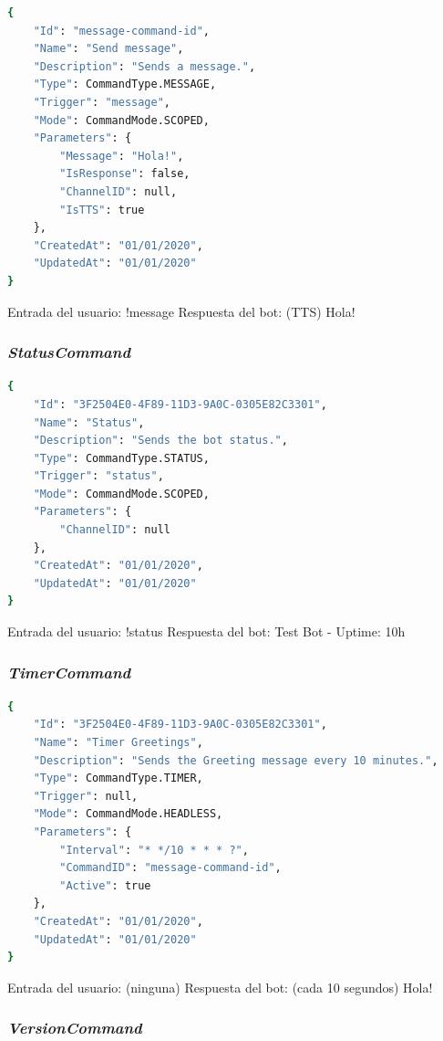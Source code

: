 \begin{lstlisting}[language=sh]
{
    "Id": "message-command-id",
    "Name": "Send message",
    "Description": "Sends a message.",
    "Type": CommandType.MESSAGE,
    "Trigger": "message",
    "Mode": CommandMode.SCOPED,
    "Parameters": {
        "Message": "Hola!",
        "IsResponse": false,
        "ChannelID": null,
        "IsTTS": true
    },
    "CreatedAt": "01/01/2020",
    "UpdatedAt": "01/01/2020"
}
\end{lstlisting}

Entrada del usuario: !message
Respuesta del bot: (TTS) Hola!



\subsubsection{\textit{StatusCommand}}

\begin{lstlisting}[language=sh]
{
    "Id": "3F2504E0-4F89-11D3-9A0C-0305E82C3301",
    "Name": "Status",
    "Description": "Sends the bot status.",
    "Type": CommandType.STATUS,
    "Trigger": "status",
    "Mode": CommandMode.SCOPED,
    "Parameters": {
        "ChannelID": null
    },
    "CreatedAt": "01/01/2020",
    "UpdatedAt": "01/01/2020"
}
\end{lstlisting}

Entrada del usuario: !status
Respuesta del bot: Test Bot - Uptime: 10h



\subsubsection{\textit{TimerCommand}}

\begin{lstlisting}[language=sh]
{
    "Id": "3F2504E0-4F89-11D3-9A0C-0305E82C3301",
    "Name": "Timer Greetings",
    "Description": "Sends the Greeting message every 10 minutes.",
    "Type": CommandType.TIMER,
    "Trigger": null,
    "Mode": CommandMode.HEADLESS,
    "Parameters": {
        "Interval": "* */10 * * * ?",
        "CommandID": "message-command-id",
        "Active": true
    },
    "CreatedAt": "01/01/2020",
    "UpdatedAt": "01/01/2020"
}
\end{lstlisting}

Entrada del usuario: (ninguna)
Respuesta del bot: (cada 10 segundos) Hola!



\subsubsection{\textit{VersionCommand}}

